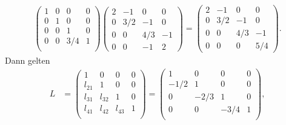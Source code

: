 \documentclass[english, parskip=full]{scrartcl}
\begin{document}
\begin{align}
\begin{pmatrix}
1 & 0 & 0 & 0 \\
0 & 1 & 0 & 0 \\
0 & 0 & 1 & 0 \\
0 & 0 & 3/4 & 1 \\
\end{pmatrix}\begin{pmatrix}
2 & -1 & 0 & 0 \\
0 & 3/2 & -1 & 0 \\
0 & 0 & 4/3 & -1 \\
0 & 0 & -1 & 2
\end{pmatrix} = \begin{pmatrix}
2 & -1 & 0 & 0 \\
0 & 3/2 & -1 & 0 \\
0 & 0 & 4/3 & -1 \\
0 & 0 & 0 & 5/4
\end{pmatrix}.
\end{align}
Dann gelten
\begin{align}
L &= \begin{pmatrix}
1 & 0 & 0 & 0 \\
l_{21} & 1 & 0 & 0 \\
l_{31} & l_{32} & 1 & 0 \\
l_{41} & l_{42} & l_{43} & 1 \\
\end{pmatrix} = \begin{pmatrix}
1 & 0 & 0 & 0 \\
-1/2 & 1 & 0 & 0 \\
0 & -2/3 & 1 & 0 \\
0 & 0 & -3/4 & 1 \\
\end{pmatrix},
\end{align}
\end{document}
